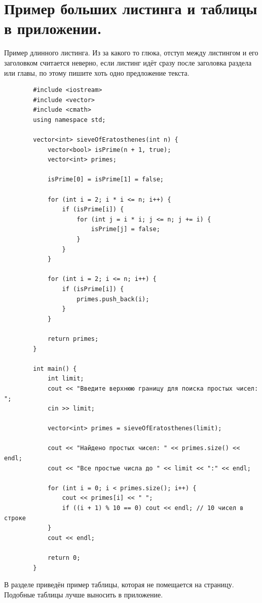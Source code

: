 \section{Пример больших листинга и таблицы в приложении.}\label{sec:appB}


Пример длинного листинга. Из за какого то глюка, отступ между листингом и его заголовком считается неверно, если листинг идёт сразу после заголовка раздела или главы, по этому пишите хоть одно предложение текста. 

\begin{VKRlonglisting}
    \caption{Пример длинного листинга}
	\begin{verbatim}
		#include <iostream>
		#include <vector>
		#include <cmath>
		using namespace std;
		
		vector<int> sieveOfEratosthenes(int n) {
			vector<bool> isPrime(n + 1, true);
			vector<int> primes;
			
			isPrime[0] = isPrime[1] = false;
			
			for (int i = 2; i * i <= n; i++) {
				if (isPrime[i]) {
					for (int j = i * i; j <= n; j += i) {
						isPrime[j] = false;
					}
				}
			}
			
			for (int i = 2; i <= n; i++) {
				if (isPrime[i]) {
					primes.push_back(i);
				}
			}
			
			return primes;
		}
		
		int main() {
			int limit;
			cout << "Введите верхнюю границу для поиска простых чисел: ";
			cin >> limit;
			
			vector<int> primes = sieveOfEratosthenes(limit);
			
			cout << "Найдено простых чисел: " << primes.size() << endl;
			cout << "Все простые числа до " << limit << ":" << endl;
			
			for (int i = 0; i < primes.size(); i++) {
				cout << primes[i] << " ";
				if ((i + 1) % 10 == 0) cout << endl; // 10 чисел в строке
			}
			cout << endl;
			
			return 0;
		}	
	\end{verbatim}

\end{VKRlonglisting}


В разделе приведён пример таблицы, которая не помещается на страницу. Подобные таблицы лучше выносить в приложение.

